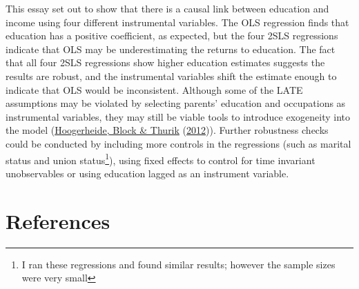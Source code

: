 \documentclass[11pt,preprint, authoryear]{elsarticle}
\numberwithin{equation}{section}
\numberwithin{figure}{section}
\numberwithin{table}{section}
\let\rmarkdownfootnote\footnote%
\def\footnote{\protect\rmarkdownfootnote}
\begin{document}
This essay set out to show that there is a causal link between education
and income using four different instrumental variables. The OLS
regression finds that education has a positive coefficient, as expected,
but the four 2SLS regressions indicate that OLS may be underestimating
the returns to education. The fact that all four 2SLS regressions show
higher education estimates suggests the results are robust, and the
instrumental variables shift the estimate enough to indicate that OLS
would be inconsistent. Although some of the LATE assumptions may be
violated by selecting parents' education and occupations as instrumental
variables, they may still be viable tools to introduce exogeneity into
the model (\protect\hyperlink{ref-block}{Hoogerheide, Block \& Thurik}
(\protect\hyperlink{ref-block}{2012})). Further robustness checks could
be conducted by including more controls in the regressions (such as
marital status and union status\footnote{I ran these regressions and
  found similar results; however the sample sizes were very small}),
using fixed effects to control for time invariant unobservables or using
education lagged as an instrument variable.

\newpage

\hypertarget{references}{%
\section*{References}\label{references}}
\end{document}
